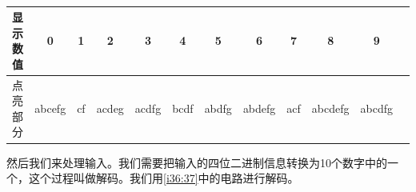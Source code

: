 \begin{figure}[!ht]
\begin{center}
\quad
{}
\end{center}
\caption{}
\label{i34:35}
\end{figure}

\begin{table}[!ht]
\centering
\begin{tabular}{c|c|c|c|c|c|c|c|c|c|c|c}
显示数值&0		&1	&2		&3		&4		&5		&6		&7		&8			&9\\
\hline
点亮部分&abcefg	&cf	&acdeg	&acdfg	&bcdf	&abdfg	&abdefg	&acf	&abcdefg	&abcdfg
\end{tabular}
\caption{}
\label{qiduanxian}
\end{table}

然后我们来处理输入。我们需要把输入的四位二进制信息转换为10个数字中的一个，这个过程叫做解码。我们用\autoref{i36:37}中的电路进行解码。

